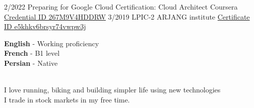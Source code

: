 \documentclass[9pt]{developercv}
\begin{document}
\begin{entrylist}
	\entry
	{2/2022}
	{Preparing for Google Cloud Certification: Cloud Architect}
	{Coursera}
	{{\href{https://www.coursera.org/account/accomplishments/professional-cert/267M9V4HDDRW}{Credential ID 267M9V4HDDRW}}}
	\entry
	{3/2019}
	{LPIC-2}
	{ARJANG institute}
	{{\href{''}{Certificate ID e5khkv6brsyr74vwpw3j}}}

\end{entrylist}


\begin{minipage}[t]{0.45\textwidth}
	\vspace{-\baselineskip} %


	\textbf{English} - Working proficiency\\
	\textbf{French} - B1 level\\
	\textbf{Persian} - Native\\\
\end{minipage}
\hfill
\begin{minipage}[t]{0.45\textwidth}
	\vspace{-\baselineskip} %


	I love running, biking and building simpler life using new technologies\\
	I trade in stock markets in my free time.
\end{minipage}
\end{document}
